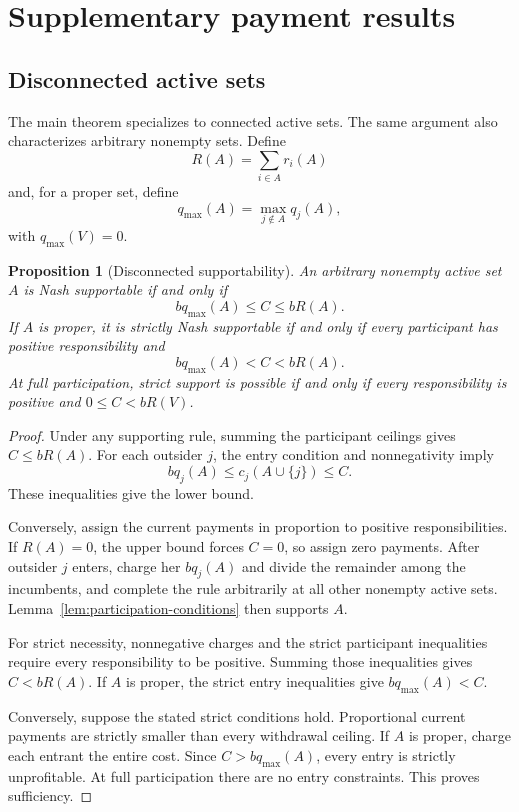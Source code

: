 \documentclass[preprint,12pt,authoryear]{elsarticle}
\newtheorem{proposition}{Proposition}
\begin{document}
\section{Supplementary payment results}
\label{app:payment-results}

\subsection{Disconnected active sets}

The main theorem specializes to connected active sets. The same argument
also characterizes arbitrary nonempty sets. Define
\[
 R(A)=\sum_{i\in A}r_i(A)
\]
and, for a proper set, define
\[
 q_{\max}(A)=\max_{j\notin A}q_j(A),
\]
with \(q_{\max}(V)=0\).

\begin{proposition}[Disconnected supportability]
\label{prop:general-supportability}
An arbitrary nonempty active set \(A\) is Nash supportable if and only if
\[
 bq_{\max}(A)\leq C\leq bR(A).
\]
If \(A\) is proper, it is strictly Nash supportable if and only if every
participant has positive responsibility and
\[
 bq_{\max}(A)<C<bR(A).
\]
At full participation, strict support is possible if and only if every
responsibility is positive and \(0\leq C<bR(V)\).
\end{proposition}

\begin{proof}
Under any supporting rule, summing the participant ceilings gives
\(C\leq bR(A)\). For each outsider \(j\), the entry condition and
nonnegativity imply
\[
 bq_j(A)\leq c_j(A\cup\{j\})\leq C.
\]
These inequalities give the lower bound.

Conversely, assign the current payments in proportion to positive
responsibilities. If \(R(A)=0\), the upper bound forces \(C=0\), so assign
zero payments. After outsider \(j\) enters, charge her \(bq_j(A)\) and divide
the remainder among the incumbents, and complete the rule arbitrarily at all
other nonempty active sets. Lemma~\ref{lem:participation-conditions} then
supports \(A\).

For strict necessity, nonnegative charges and the strict participant
inequalities require every responsibility to be positive. Summing those
inequalities gives \(C<bR(A)\). If \(A\) is proper, the strict entry
inequalities give \(bq_{\max}(A)<C\).

Conversely, suppose the stated strict conditions hold. Proportional current
payments are strictly smaller than every withdrawal ceiling. If \(A\) is
proper, charge each entrant the entire cost. Since
\(C>bq_{\max}(A)\), every entry is strictly unprofitable. At full
participation there are no entry constraints. This proves sufficiency.
\end{proof}
\end{document}
